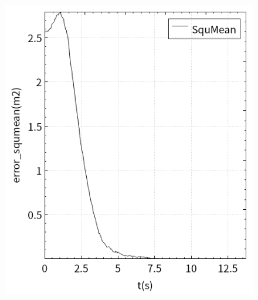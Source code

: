 \documentclass[fontset=fandol,type=bachelor,campus=harbin,bsmainpagenumberline=true]{hithesisbook}
\begin{document}
\begin{figure}[h]
{\begin{minipage}[h]{0.40\textwidth}
   		 	\includegraphics[width=1\textwidth]{chapter5/特征偏差收敛一致化/error_squmean0}
    		\end{minipage}
		\label{视觉伺服曲线（最终效果）b}
    	}
	\\ 
\end{figure}
\end{document}
